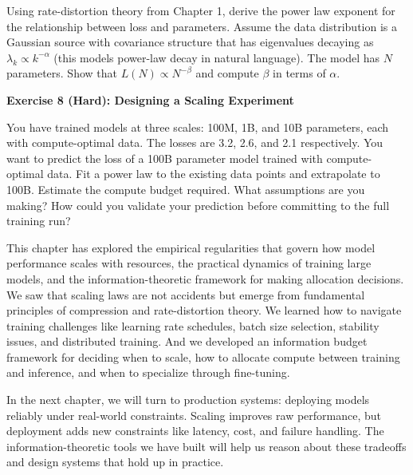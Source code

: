 Using rate-distortion theory from Chapter 1, derive the power law exponent for the relationship between loss and parameters. Assume the data distribution is a Gaussian source with covariance structure that has eigenvalues decaying as $\lambda_k \propto k^{-\alpha}$ (this models power-law decay in natural language). The model has $N$ parameters. Show that $L(N) \propto N^{-\beta}$ and compute $\beta$ in terms of $\alpha$.

\vspace{0.5em}

\textbf{Exercise 8 (Hard): Designing a Scaling Experiment}

You have trained models at three scales: 100M, 1B, and 10B parameters, each with compute-optimal data. The losses are 3.2, 2.6, and 2.1 respectively. You want to predict the loss of a 100B parameter model trained with compute-optimal data. Fit a power law to the existing data points and extrapolate to 100B. Estimate the compute budget required. What assumptions are you making? How could you validate your prediction before committing to the full training run?

\vspace{1.5em}

This chapter has explored the empirical regularities that govern how model performance scales with resources, the practical dynamics of training large models, and the information-theoretic framework for making allocation decisions. We saw that scaling laws are not accidents but emerge from fundamental principles of compression and rate-distortion theory. We learned how to navigate training challenges like learning rate schedules, batch size selection, stability issues, and distributed training. And we developed an information budget framework for deciding when to scale, how to allocate compute between training and inference, and when to specialize through fine-tuning.

In the next chapter, we will turn to production systems: deploying models reliably under real-world constraints. Scaling improves raw performance, but deployment adds new constraints like latency, cost, and failure handling. The information-theoretic tools we have built will help us reason about these tradeoffs and design systems that hold up in practice.

\vspace{1em}

